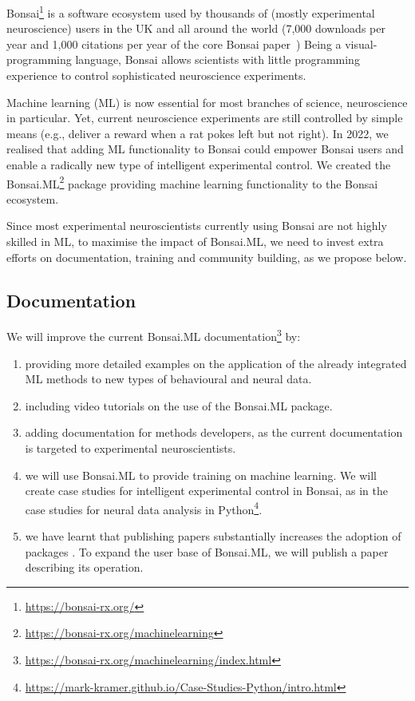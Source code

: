 Bonsai\footnote[1]{\url{https://bonsai-rx.org/}} is a software ecosystem used by thousands
of (mostly experimental neuroscience) users in the UK and all around the world
(7,000 downloads per year and 1,000 citations per year of the core Bonsai
paper~\citep{lopesEtAl15})
%
Being a visual-programming language, Bonsai allows scientists with little
programming experience to control sophisticated neuroscience experiments.

Machine learning (ML) is now essential for most branches of science,
neuroscience in particular.
%
Yet, current neuroscience experiments are still controlled by simple means
(e.g., deliver a reward when a rat pokes left but not right).
%
In 2022, we realised that adding ML functionality to Bonsai could empower
Bonsai users and enable a radically new type of intelligent experimental
control.
%
We created the
Bonsai.ML\footnote[2]{\url{https://bonsai-rx.org/machinelearning}}
package providing machine learning functionality to the Bonsai ecosystem.

Since most experimental neuroscientists currently using Bonsai are not highly
skilled in ML, to maximise the impact of Bonsai.ML, we need to invest extra
efforts on documentation, training and community building, as we propose below.

\subsection*{Documentation}

We will improve the current Bonsai.ML
documentation\footnote[8]{\url{https://bonsai-rx.org/machinelearning/index.html}}
by:

\begin{enumerate}

    \item providing more detailed examples on the application of the
        already integrated ML methods to new types of behavioural and
        neural data.

    \item including video tutorials on the use of the Bonsai.ML
        package.

    \item adding documentation for methods developers, as the current
        documentation is targeted to experimental neuroscientists.

    \item we will use Bonsai.ML to provide training on machine learning. We
        will create case studies for intelligent experimental control in
        Bonsai, as in the case studies for neural data analysis in
        Python\footnote[9]{\url{https://mark-kramer.github.io/Case-Studies-Python/intro.html}}.

    \item we have learnt that publishing papers substantially increases the
        adoption of packages \citep{lopesEtAl15,guilbeaultEtAl21}. To expand
        the user base of Bonsai.ML, we will publish a paper describing its
        operation.

\end{enumerate}

